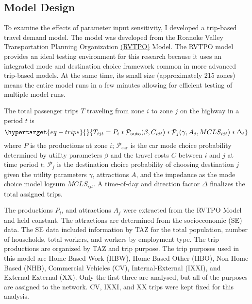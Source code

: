 \documentclass[
  letterpaper,
]{trb}
\begin{document}
\hypertarget{model-design}{%
\subsection{Model Design}\label{model-design}}

To examine the effects of parameter input sensitivity, I developed a
trip-based travel demand model. The model was developed from the Roanoke
Valley Transportation Planning Organization
\href{https://github.com/xinwangvdot/rvtpo}{(RVTPO)} Model. The RVTPO
model provides an ideal testing environment for this research because it
uses an integrated mode and destination choice framework common in more
advanced trip-based models. At the same time, its small size
(approximately 215 zones) means the entire model runs in a few minutes
allowing for efficient testing of multiple model runs.

The total passenger trips \(T\) traveling from zone \(i\) to zone \(j\)
on the highway in a period \(t\) is
\begin{equation}\protect\hypertarget{eq-trips}{}{
T_{ijt} = P_i * \mathcal{P}_{\mathrm{auto}}(\beta, C_{ijt}) * \mathcal{P}_j(\gamma, A_j, MCLS_{ijt}) * \Delta_t 
}\label{eq-trips}\end{equation} where \(P\) is the productions at zone
\(i\); \(\mathcal{P}_{\mathrm{car}}\) is the car mode choice probability
determined by utility parameters \(\beta\) and the travel costs \(C\)
between \(i\) and \(j\) at time period \(t\); \(\mathcal{P}_{j}\) is the
destination choice probability of choosing destination \(j\) given the
utility parameters \(\gamma\), attractions \(A\), and the impedance as
the mode choice model logsum \(MCLS_{ijt}\). A time-of-day and direction
factor \(\Delta\) finalizes the total assigned trips.

The productions \(P_i\), and attractions \(A_j\) were extracted from the
RVTPO Model and held constant. The attractions are determined from the
socioeconomic (SE) data. The SE data included information by TAZ for the
total population, number of households, total workers, and workers by
employment type. The trip productions are organized by TAZ and trip
purpose. The trip purposes used in this model are Home Based Work (HBW),
Home Based Other (HBO), Non-Home Based (NHB), Commercial Vehicles (CV),
Internal-External (IXXI), and External-External (XX). Only the first
three are analysed, but all of the purposes are assigned to the network.
CV, IXXI, and XX trips were kept fixed for this analysis.
\end{document}
